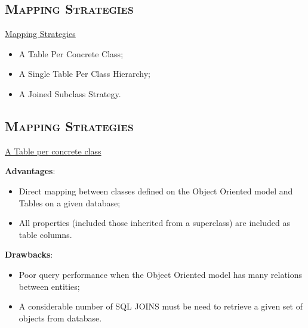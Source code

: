 \documentclass[xcolor=x11names,compress]{beamer}
\renewcommand{\(}{\begin{columns}}
\renewcommand{\)}{\end{columns}}
\newcommand{\<}[1]{\begin{column}{#1}}
\renewcommand{\>}{\end{column}}
\begin{document}
\subsection{\scshape Mapping Strategies}
\begin{frame}{\underline{Mapping Strategies}}
\justifying

\begin{itemize}
\itemsep 12pt

\item A Table Per Concrete Class;

\item A Single Table Per Class Hierarchy;

\item A Joined Subclass Strategy.

\end{itemize}
\end{frame}
\subsection{\scshape Mapping Strategies}
\begin{frame}{\underline{A Table per concrete class}}
\justifying

\textbf{Advantages}:

\begin{itemize}
\itemsep 12pt
\justifying
\item Direct mapping between classes defined on the Object Oriented model and Tables on a given database;

\item All properties (included those inherited from a superclass) are included as table columns.

\end{itemize}

\textbf{Drawbacks}:
\begin{itemize}
\itemsep 12pt
\justifying
\item Poor query performance when the Object Oriented model has many relations between entities;
\item A considerable number of SQL JOINS must be need to retrieve a given set of objects from database.

\end{itemize}
\end{frame}
\end{document}
